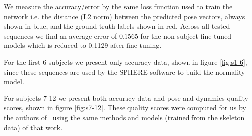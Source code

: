\documentclass[11pt]{article} %
\begin{document}
We measure the accuracy/error by the same loss function used to train the network i.e. the distance (L2 norm) between the predicted pose vectors, always shown in blue, and the ground truth labels shown in red. Across all tested sequences we find an average error of 0.1565 for the non subject fine tuned models which is reduced to 0.1129 after fine tuning. 


For the first 6 subjects we present only accuracy data, shown in figure \ref{fig:s1-6}, since these sequences are used by the SPHERE software to build the normality model.

For subjects 7-12 we present both accuracy data and pose and dynamics quality scores, shown in figure \ref{fig:s7-12}. These quality scores were computed for us by the authors of~\cite{Paiement} using the same methods and models (trained from the skeleton data) of that work. 
\end{document}
